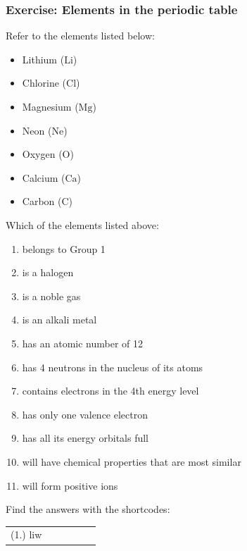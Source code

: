             \subsubsection{ Exercise: Elements in the periodic table         }
            \nopagebreak
            \label{m38760*id262476}Refer to the elements listed below: \label{m38760*id7632}\begin{itemize}[noitemsep]
            \item Lithium ($\mathrm{Li}$)\item Chlorine ($\mathrm{Cl}$)\item Magnesium ($\mathrm{Mg}$)\item Neon ($\mathrm{Ne}$)\item Oxygen ($\mathrm{O}$)\item Calcium ($\mathrm{Ca}$)\item Carbon ($\mathrm{C}$)\end{itemize}
         Which of the elements listed above:
        \label{m38760*id262499}\begin{enumerate}[noitemsep, label=\textbf{\arabic*}. ] 
            \label{m38760*uid158}\item belongs to Group 1
\label{m38760*uid159}\item is a halogen
\label{m38760*uid160}\item is a noble gas
\label{m38760*uid161}\item is an alkali metal
\label{m38760*uid162}\item has an atomic number of 12
\label{m38760*uid163}\item has 4 neutrons in the nucleus of its atoms
\label{m38760*uid164}\item contains electrons in the 4th energy level
\label{m38760*uid165}\item has only one valence electron
\label{m38760*uid166}\item has all its energy orbitals full
\label{m38760*uid167}\item will have chemical properties that are most similar
\label{m38760*uid168}\item will form positive ions
\end{enumerate}
         \par 
\label{m38760**end}
\par {} Find the answers with the shortcodes:
 \par \begin{tabular}[h]{cccccc}
 (1.) liw  & \end{tabular}
